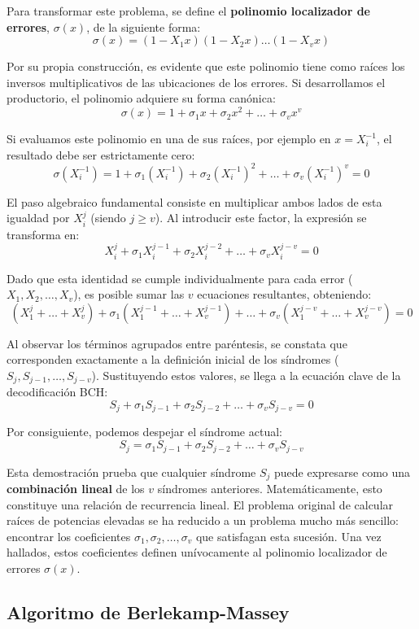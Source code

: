 Para transformar este problema, se define el \textbf{polinomio localizador de errores}, $\sigma(x)$, de la siguiente forma:
$$ \sigma(x) = (1 - X_1 x)(1 - X_2 x) \dots (1 - X_v x) $$

Por su propia construcción, es evidente que este polinomio tiene como raíces los inversos multiplicativos de las ubicaciones de los errores. Si desarrollamos el productorio, el polinomio adquiere su forma canónica:
$$ \sigma(x) = 1 + \sigma_1 x + \sigma_2 x^2 + \dots + \sigma_v x^v $$

Si evaluamos este polinomio en una de sus raíces, por ejemplo en $x = X_i^{-1}$, el resultado debe ser estrictamente cero:
$$ \sigma(X_i^{-1}) = 1 + \sigma_1 (X_i^{-1}) + \sigma_2 (X_i^{-1})^2 + \dots + \sigma_v (X_i^{-1})^v = 0 $$

El paso algebraico fundamental consiste en multiplicar ambos lados de esta igualdad por $X_i^j$ (siendo $j \geq v$). Al introducir este factor, la expresión se transforma en:
$$ X_i^j + \sigma_1 X_i^{j-1} + \sigma_2 X_i^{j-2} + \dots + \sigma_v X_i^{j-v} = 0 $$

Dado que esta identidad se cumple individualmente para cada error ($X_1, X_2, \dots, X_v$), es posible sumar las $v$ ecuaciones resultantes, obteniendo:
$$ \left(X_1^j + \dots + X_v^j\right) + \sigma_1 \left(X_1^{j-1} + \dots + X_v^{j-1}\right) + \dots + \sigma_v \left(X_1^{j-v} + \dots + X_v^{j-v}\right) = 0 $$

Al observar los términos agrupados entre paréntesis, se constata que corresponden exactamente a la definición inicial de los síndromes ($S_j, S_{j-1}, \dots, S_{j-v}$). Sustituyendo estos valores, se llega a la ecuación clave de la decodificación BCH:
$$ S_j + \sigma_1 S_{j-1} + \sigma_2 S_{j-2} + \dots + \sigma_v S_{j-v} = 0 $$

Por consiguiente, podemos despejar el síndrome actual:
$$ S_j = \sigma_1 S_{j-1} + \sigma_2 S_{j-2} + \dots + \sigma_v S_{j-v} $$

Esta demostración prueba que cualquier síndrome $S_j$ puede expresarse como una \textbf{combinación lineal} de los $v$ síndromes anteriores. Matemáticamente, esto constituye una relación de recurrencia lineal. El problema original de calcular raíces de potencias elevadas se ha reducido a un problema mucho más sencillo: encontrar los coeficientes $\sigma_1, \sigma_2, \dots, \sigma_v$ que satisfagan esta sucesión. Una vez hallados, estos coeficientes definen unívocamente al polinomio localizador de errores $\sigma(x)$.

\subsection{Algoritmo de Berlekamp-Massey}

